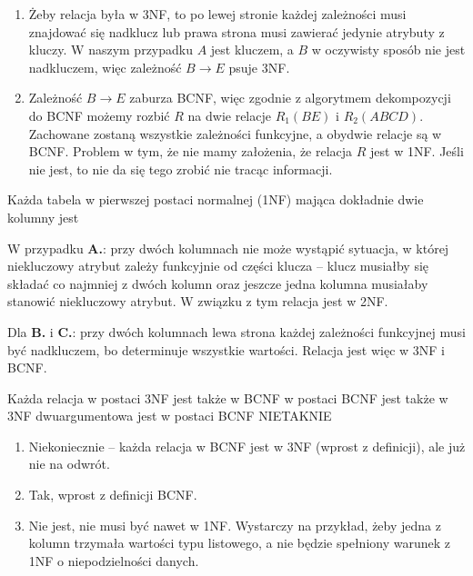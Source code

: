 \begin{solutions}
\begin{enumerate}[\bf A.]
    	\item Żeby relacja była w 3NF, to po lewej stronie każdej zależności musi znajdować się nadklucz lub prawa strona musi zawierać jedynie atrybuty z kluczy. W naszym przypadku $A$ jest kluczem, a $B$ w oczywisty sposób nie jest nadkluczem, więc zależność $B\rightarrow E$ psuje 3NF.
    	
    	\item Zależność $B\rightarrow E$ zaburza BCNF, więc zgodnie z algorytmem dekompozycji do BCNF możemy rozbić $R$ na dwie relacje $R_1(BE)$ i $R_2(ABCD)$. Zachowane zostaną wszystkie zależności funkcyjne, a obydwie relacje są w BCNF. Problem w tym, że nie mamy założenia, że relacja $R$ jest w 1NF. Jeśli nie jest, to nie da się tego zrobić nie tracąc informacji.
    \end{enumerate}

    \sol Każda tabela w pierwszej postaci normalnej (1NF) mająca dokładnie dwie kolumny jest

    W przypadku \textbf{A.}: przy dwóch kolumnach nie może wystąpić sytuacja, w której niekluczowy atrybut zależy funkcyjnie od części klucza -- klucz musiałby się składać co najmniej z dwóch kolumn oraz jeszcze jedna kolumna musiałaby stanowić niekluczowy atrybut. W związku z tym relacja jest w 2NF.
    
    Dla \textbf{B.} i \textbf{C.}: przy dwóch kolumnach lewa strona każdej zależności funkcyjnej musi być nadkluczem, bo determinuje wszystkie wartości. Relacja jest więc w 3NF i BCNF.
    
    \sol Każda relacja
    \answerss
    {w postaci 3NF jest także w BCNF}
    {w postaci BCNF jest także w 3NF}
    {dwuargumentowa jest w postaci BCNF}
    {NIE}{TAK}{NIE}
    
    \begin{enumerate}[\bf A.]
        \item Niekoniecznie -- każda relacja w BCNF jest w 3NF (wprost z definicji), ale już nie na odwrót.

        \item Tak, wprost z definicji BCNF.

        \item Nie jest, nie musi być nawet w 1NF. Wystarczy na przykład, żeby jedna z kolumn trzymała wartości typu listowego, a nie będzie spełniony warunek z 1NF o niepodzielności danych.
    \end{enumerate}


\end{solutions}
